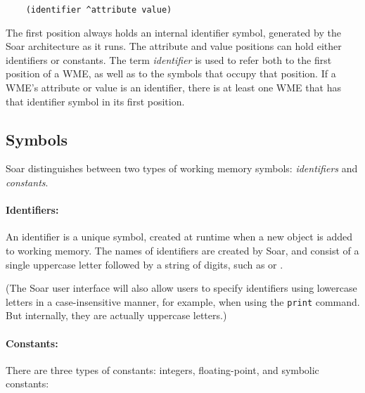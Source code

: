 \begin{verbatim}
	(identifier ^attribute value)
\end{verbatim}

The first position always holds an internal identifier symbol, generated by the Soar architecture as it runs. The attribute and value positions can hold either identifiers or constants. The term \emph{identifier} is used to refer both to the first position of a WME, as well as to the symbols that occupy that position. If a WME's attribute or value is an identifier, there is at least one WME that has that identifier symbol in its first position.


\subsection{Symbols}
\label{SYNTAX-wm-symbols}

Soar distinguishes between two types of working memory symbols: \emph{identifiers} and {\em constants}.

\paragraph{Identifiers:}

An identifier is a unique symbol, created at runtime when a new object is added to working memory. The names of identifiers are
created by Soar, and consist of a single uppercase letter followed by a string of digits, such as  or .

(The Soar user interface will also allow users to specify identifiers using lowercase letters in a case-insensitive manner, for example, when using the \texttt{print} command. But internally, they are actually uppercase letters.)

\paragraph{Constants:}

There are three types of constants: integers, floating-point, and symbolic constants:

